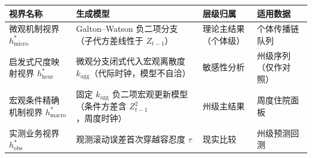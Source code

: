\begin{tabular}{@{}>{\raggedright\arraybackslash}p{3.4cm}>{\raggedright\arraybackslash}p{4.0cm}>{\raggedright\arraybackslash}p{2.6cm}>{\raggedright\arraybackslash}p{3.2cm}@{}}
\toprule
视界名称 & 生成模型 & 层级归属 & 适用数据 \\
\midrule
微观机制视界 $h^*_{\text{micro}}$ & Galton--Watson 负二项分支（子代方差线性于 $Z_{t-1}$） & 理论主结果（个体级） & 个体传播链队列 \\
启发式尺度映射视界 $h^*_{\text{heur}}$ & 微观分支闭式代入宏观离散度 $k_{\text{agg}}$（代际时钟，模型不自洽） & 敏感性分析 & 州级序列（仅作对照） \\
宏观条件精确机制视界 $h^*_{\text{macro}}$ & 固定 $k_{\text{agg}}$ 负二项宏观更新模型（条件方差含 $Z_{t-1}^2$，周度时钟） & 州级主结果 & 周度住院面板 \\
实测业务视界 $h^*_{\text{obs}}$ & 观测滚动误差首次穿越容忍度 $\tau$ & 现实比较 & 州级预测回测 \\
\bottomrule
\end{tabular}